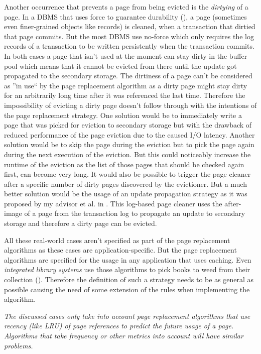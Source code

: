     Another occurrence that prevents a page from being evicted is the \emph{dirtying} of a page. In a DBMS that uses force to guarantee durability (\cite{Haerder:1983b}), a page (sometimes even finer-grained objects like records) is cleaned, when a transaction that dirtied that page commits. But the most DBMS use no-force which only requires the log records of a transaction to be written persistently when the transaction commits. In both cases a page that isn't used at the moment can stay dirty in the buffer pool which means that it cannot be evicted from there until the update got propagated to the secondary storage. The dirtiness of a page can't be considered as ''in use`` by the page replacement algorithm as a dirty page might stay dirty for an arbitrarily long time after it was referenced the last time. Therefore the impossibility of evicting a dirty page doesn't follow through with the intentions of the page replacement strategy. One solution would be to immediately write a page that was picked for eviction to secondary storage but with the drawback of reduced performance of the page eviction due to the caused I/O latency. Another solution would be to skip the page during the eviction but to pick the page again during the next execution of the eviction. But this could noticeably increase the runtime of the eviction as the list of those pages that should be checked again first, can become very long. It would also be possible to trigger the page cleaner after a specific number of dirty pages discovered by the evictioner. But a much better solution would be the usage of an update propagation strategy as it was proposed by my advisor et al. in \cite{Sauer:2016}. This log-based page cleaner uses the after-image of a page from the transaction log to propagate an update to secondary storage and therefore a dirty page can be evicted.

    All these real-world cases aren't specified as part of the page replacement algorithms as these cases are application-specific. But the page replacement algorithms are specified for the usage in any application that uses caching. Even \emph{integrated library systems} use those algorithms to pick books to weed from their collection (\cite{ChuckFinley}). Therefore the definition of such a strategy needs to be as general as possible causing the need of some extension of the rules when implementing the algorithm.

    \textit{The discussed cases only take into account page replacement algorithms that use recency (like LRU) of page references to predict the future usage of a page. Algorithms that take frequency or other metrics into account will have similar problems.}

